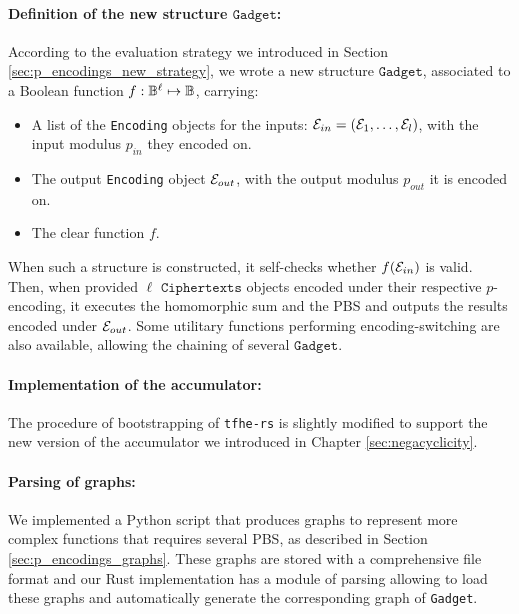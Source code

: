 \paragraph{Definition of the new structure $\texttt{Gadget}$: } According to the evaluation strategy we introduced in Section \ref{sec:p_encodings_new_strategy}, we wrote a new structure $\texttt{Gadget}$, associated to a Boolean function $f: \mathbb{B}^\ell \mapsto \mathbb{B}$, carrying:
\begin{itemize}
    \item A list of the \texttt{Encoding} objects for the inputs: $\mathcal{E}_{in} = (\mathcal{E}_1, \dots, \mathcal{E}_l)$, with the input modulus $p_{in}$ they encoded on.
    \item The output \texttt{Encoding} object $\mathcal{E}_{out}$, with the output modulus $p_{out}$ it is encoded on.
    \item The clear function $f$.
\end{itemize}
When such a structure is constructed, it self-checks whether $f(\mathcal{E}_{in})$ is valid. Then, when provided $\ell$ $\texttt{Ciphertexts}$ objects encoded under their respective $p$-encoding, it executes the homomorphic sum and the PBS and outputs the results encoded under $\mathcal{E}_{out}$. Some utilitary functions performing encoding-switching are also available, allowing the chaining of several $\texttt{Gadget}$.


\paragraph{Implementation of the accumulator: } The procedure of bootstrapping of \texttt{tfhe-rs} is slightly modified to support the new version of the accumulator we introduced in Chapter \ref{sec:negacyclicity}.

\paragraph{Parsing of graphs: } We implemented a Python script that produces graphs to represent more complex functions that requires several PBS, as described in Section \ref{sec:p_encodings_graphs}. These graphs are stored with a comprehensive file format and our Rust implementation has a module of parsing allowing to load these graphs and automatically generate the corresponding graph of \texttt{Gadget}.



